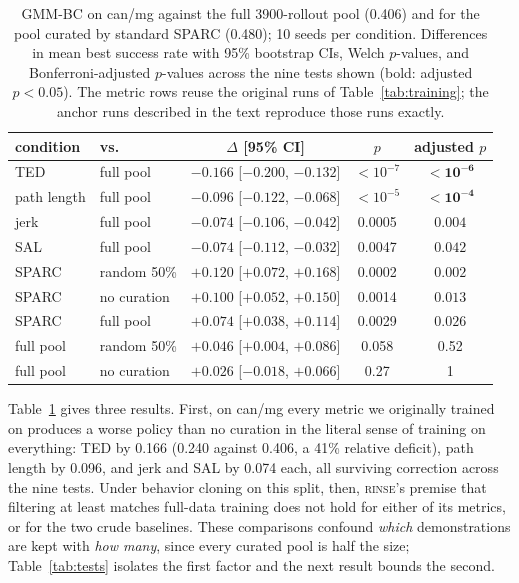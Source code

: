 \documentclass[10pt]{article}
\newcommand{\rinse}{\textmd{\textsc{rinse}}}
\begin{document}
\begin{table}[t]
\centering
\small
\begin{tabular}{llccc}
\toprule
condition & vs. & $\Delta$ [95\% CI] & $p$ & adjusted $p$ \\
\midrule
TED         & full pool & $-0.166$ [$-0.200$, $-0.132$] & $<10^{-7}$ & $\mathbf{<10^{-6}}$ \\
path length & full pool & $-0.096$ [$-0.122$, $-0.068$] & $<10^{-5}$ & $\mathbf{<10^{-4}}$ \\
jerk        & full pool & $-0.074$ [$-0.106$, $-0.042$] & 0.0005 & $\mathbf{0.004}$ \\
SAL         & full pool & $-0.074$ [$-0.112$, $-0.032$] & 0.0047 & $\mathbf{0.042}$ \\
\midrule
SPARC       & random 50\% & $+0.120$ [$+0.072$, $+0.168$] & 0.0002 & $\mathbf{0.002}$ \\
SPARC       & no curation & $+0.100$ [$+0.052$, $+0.150$] & 0.0014 & $\mathbf{0.013}$ \\
SPARC       & full pool & $+0.074$ [$+0.038$, $+0.114$] & 0.0029 & $\mathbf{0.026}$ \\
\midrule
full pool   & random 50\% & $+0.046$ [$+0.004$, $+0.086$] & 0.058 & 0.52 \\
full pool   & no curation & $+0.026$ [$-0.018$, $+0.066$] & 0.27 & 1 \\
\bottomrule
\end{tabular}
\caption{GMM-BC on can/mg against the full 3900-rollout pool (0.406) and for
the pool curated by standard SPARC (0.480); 10 seeds per condition.
Differences in mean best success rate with 95\% bootstrap CIs, Welch
$p$-values, and Bonferroni-adjusted $p$-values across the nine tests shown
(bold: adjusted $p < 0.05$). The metric rows reuse the original runs of
Table~\ref{tab:training}; the anchor runs described in the text reproduce
those runs exactly.}
\label{tab:fullpool}
\end{table}

Table~\ref{tab:fullpool} gives three results. First, on can/mg every metric
we originally trained on produces a worse policy than no curation in the
literal sense of training on everything: TED by 0.166 (0.240 against
0.406, a 41\% relative deficit), path length by 0.096, and jerk and SAL by
0.074 each, all surviving correction across the nine tests. Under behavior
cloning on this split, then, \rinse{}'s premise that filtering at least
matches full-data training does not hold for either of its metrics, or for
the two crude baselines. These comparisons confound \emph{which}
demonstrations are kept with \emph{how many}, since every curated pool is
half the size; Table~\ref{tab:tests} isolates the first factor and the next
result bounds the second.
\end{document}
